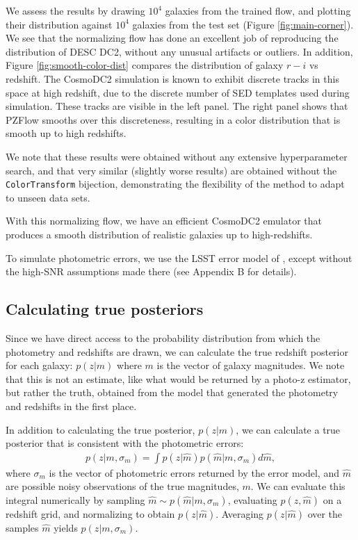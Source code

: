 \documentclass[twocolumn]{aastex631}
\begin{document}
We assess the results by drawing $10^4$ galaxies from the trained flow, and plotting their distribution against  $10^4$ galaxies from the test set (Figure \ref{fig:main-corner}).
We see that the normalizing flow has done an excellent job of reproducing the distribution of DESC DC2, without any unusual artifacts or outliers.
In addition, Figure \ref{fig:smooth-color-dist} compares the distribution of galaxy $r-i$ vs redshift.
The CosmoDC2 simulation is known to exhibit discrete tracks in this space at high redshift, due to the discrete number of SED templates used during simulation.
These tracks are visible in the left panel.
The right panel shows that PZFlow smooths over this discreteness, resulting in a color distribution that is smooth up to high redshifts.

We note that these results were obtained without any extensive hyperparameter search, and that very similar (slightly worse results) are obtained without the \texttt{ColorTransform} bijection, demonstrating the flexibility of the method to adapt to unseen data sets.

With this normalizing flow, we have an efficient CosmoDC2 emulator that produces a smooth distribution of realistic galaxies up to high-redshifts.

To simulate photometric errors, we use the LSST error model of \citet{ivezic2019}, except without the high-SNR assumptions made there (see Appendix B for details).

\subsection{Calculating true posteriors}
\label{sec:true-posteriors}

Since we have direct access to the probability distribution from which the photometry and redshifts are drawn, we can calculate the true redshift posterior for each galaxy: $p(z|m)$ where $m$ is the vector of galaxy magnitudes.
We note that this is not an estimate, like what would be returned by a photo-z estimator, but rather the truth, obtained from the model that generated the photometry and redshifts in the first place.

In addition to calculating the true posterior, $p(z|m)$, we can calculate a true posterior that is consistent with the photometric errors:
\begin{align}
    p(z|m, \sigma_m) = \int p(z|\hat{m}) p(\hat{m}|m, \sigma_m) d\hat{m},
    \label{eq:err-conv}
\end{align}
where $\sigma_m$ is the vector of photometric errors returned by the error model, and $\hat{m}$ are possible noisy observations of the true magnitudes, $m$.
We can evaluate this integral numerically by sampling $\hat{m} \sim p(\hat{m}|m, \sigma_m)$, evaluating $p(z, \hat{m})$ on a redshift grid, and normalizing to obtain $p(z|\hat{m})$.
Averaging $p(z|\hat{m})$ over the samples $\hat{m}$ yields $p(z|m, \sigma_m)$.
\end{document}

